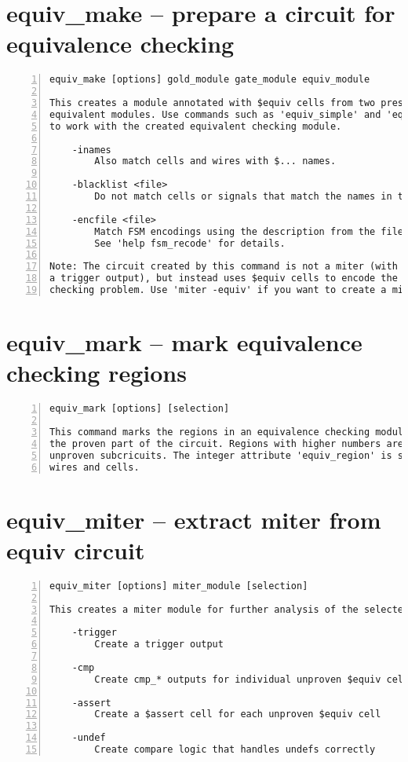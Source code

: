 \section{equiv\_make -- prepare a circuit for equivalence checking}
\label{cmd:equiv_make}
\begin{lstlisting}[numbers=left,frame=single]
    equiv_make [options] gold_module gate_module equiv_module

This creates a module annotated with $equiv cells from two presumably
equivalent modules. Use commands such as 'equiv_simple' and 'equiv_status'
to work with the created equivalent checking module.

    -inames
        Also match cells and wires with $... names.

    -blacklist <file>
        Do not match cells or signals that match the names in the file.

    -encfile <file>
        Match FSM encodings using the description from the file.
        See 'help fsm_recode' for details.

Note: The circuit created by this command is not a miter (with something like
a trigger output), but instead uses $equiv cells to encode the equivalence
checking problem. Use 'miter -equiv' if you want to create a miter circuit.
\end{lstlisting}

\section{equiv\_mark -- mark equivalence checking regions}
\label{cmd:equiv_mark}
\begin{lstlisting}[numbers=left,frame=single]
    equiv_mark [options] [selection]

This command marks the regions in an equivalence checking module. Region 0 is
the proven part of the circuit. Regions with higher numbers are connected
unproven subcricuits. The integer attribute 'equiv_region' is set on all
wires and cells.
\end{lstlisting}

\section{equiv\_miter -- extract miter from equiv circuit}
\label{cmd:equiv_miter}
\begin{lstlisting}[numbers=left,frame=single]
    equiv_miter [options] miter_module [selection]

This creates a miter module for further analysis of the selected $equiv cells.

    -trigger
        Create a trigger output

    -cmp
        Create cmp_* outputs for individual unproven $equiv cells

    -assert
        Create a $assert cell for each unproven $equiv cell

    -undef
        Create compare logic that handles undefs correctly
\end{lstlisting}

